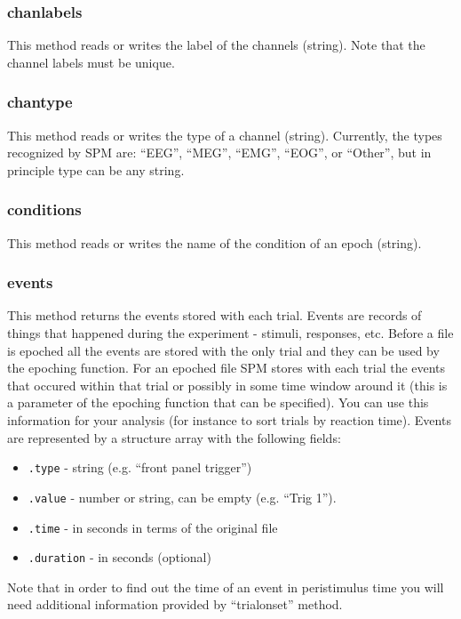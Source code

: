 \subsubsection{chanlabels}
This method reads or writes the label of the channels (string).  Note that the channel labels must be unique.

\subsubsection{chantype}
This method reads or writes the type of a channel (string). Currently, the types recognized by SPM are: ``EEG'', ``MEG'', ``EMG'', ``EOG'', or ``Other'', but in principle type can be any string.

\subsubsection{conditions}
This method  reads or writes the name of the condition of an epoch (string).

\subsubsection{events}
This method returns the events stored with each trial. Events are records of things that happened during the experiment - stimuli, responses, etc. Before a file is epoched all the events are stored with the only trial and they can be used by the epoching function. For an epoched file SPM stores with each trial the events that occured within that trial or possibly in some time window around it (this is a parameter of the epoching function that can be specified). You can use this information for your analysis (for instance to sort trials by reaction time). Events are represented by a structure array with the following fields:

\begin{itemize}
\item \texttt{.type} - string (e.g. ``front panel trigger'')
\item \texttt{.value} - number or string, can be empty (e.g. ``Trig 1'').
\item \texttt{.time} - in seconds in terms of the original file
\item \texttt{.duration} - in seconds (optional)
\end{itemize}

Note that in order to find out the time of an event in peristimulus time you will need additional information provided by ``trialonset'' method.

